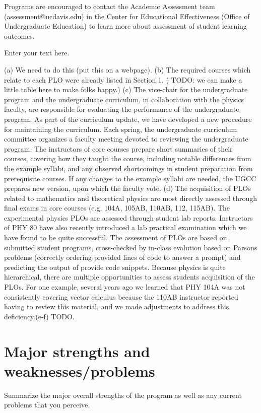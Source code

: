 \documentclass[12pt]{article}
\begin{document}
Programs are encouraged to contact the Academic Assessment team (assessment@ucdavis.edu) in the Center for Educational Effectiveness (Office of Undergraduate Education) to learn more about assessment of student learning outcomes.

Enter your text here.

(a) {\color{red} We need to do this (put this on a webpage).}
(b) The required courses which relate to each PLO were already listed in Section 1.
({\color{red} TODO: we can make a little table here to make folks happy.})
(c) The vice-chair for the undergraduate program and the undergraduate curriculum, in collaboration with the physics faculty, are responsible for evaluating the performance of the undergraduate program.
As part of the curriculum update, we have developed a new procedure for maintaining the curriculum.  Each spring, the undergraduate curriculum committee organizes a faculty meeting devoted to reviewing the undergraduate program.  The instructors of core courses prepare short summaries of their courses, covering how they taught the course, including notable differences from the example syllabi, and any observed shortcomings in student preparation from prerequisite courses.  If any changes to the example syllabi are needed, the UGCC prepares new version, upon which the faculty vote.
(d) The acquisition of PLOs related to mathematics and theoretical physics are most directly assessed through final exams in core courses (e.g. 104A, 105AB, 110AB, 112, 115AB).  The experimental physics PLOs are assessed through student lab reports.  Instructors of PHY 80 have also recently introduced a lab practical examination which we have found to be quite successful.  The assessment of PLOs are based on submitted student programs, cross-checked by in-class evalution based on Parsons problems (correctly ordering provided lines of code to answer a prompt) and predicting the output of provide code snippets.
Because physics is quite hierarchical, there are multiple opportunities to assess students acquisition of the PLOs.  For one example, several years ago we learned that PHY 104A was not consistently covering vector calculus because the 110AB instructor reported having to review this material, and we made adjustments to address this deficiency.(e-f) {\color{red} TODO.}
 
\section{Major strengths and weaknesses/problems}
Summarize the major overall strengths of the program as well as any current problems that you perceive. 
\end{document}
